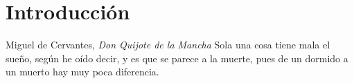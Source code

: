\chapter{Introducción}

\begin{chapquote}{Miguel de Cervantes, \textit{Don Quijote de la Mancha}}
Sola una cosa tiene mala el sueño, según he oído decir, y es que se parece a la muerte, pues de un dormido a un muerto hay muy poca diferencia.
\end{chapquote}

\lipsum[1-2]



